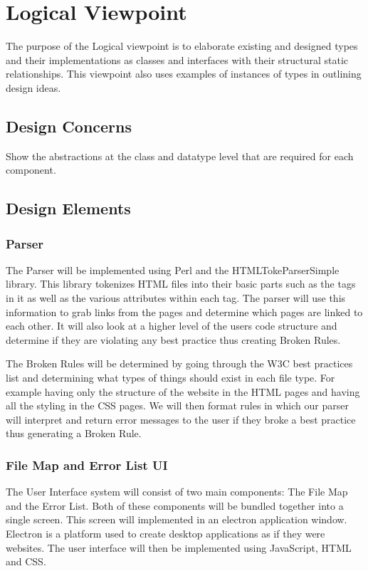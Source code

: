 \documentclass[letterpaper,10pt,titlepage,draftclsnofoot,onecolumn,onesided] {IEEEtran}
\begin{document}
	
	
\section{Logical Viewpoint}
The purpose of the Logical viewpoint is to elaborate existing and designed types and their implementations
as classes and interfaces with their structural static relationships. This viewpoint also uses examples of
instances of types in outlining design ideas. 
\subsection{Design Concerns}
Show the abstractions at the class and datatype level that are required for each component. 
\subsection{Design Elements}


	\subsubsection{Parser}
	The Parser will be implemented using Perl and the HTMLTokeParserSimple library\cite{htmltokeparser}.
	This library tokenizes HTML files into their basic parts such as the tags in it as well as the various attributes within each tag.
	The parser will use this information to grab links from the pages and determine which pages are linked to each other.
	It will also look at a higher level of the users code structure and determine if they are violating any best practice thus creating Broken Rules. 
	
	The Broken Rules will be determined by going through the W3C best practices list and determining what types of things should exist in each file type. 
	For example having only the structure of the website in the HTML pages and having all the styling in the CSS pages. 
	We will then format rules in which our parser will interpret and return error messages to the user if they broke a best practice thus generating a Broken Rule.\cite{w3c}
	

	\subsubsection{File Map and Error List UI}
	The User Interface system will consist of two main components: The File Map and the Error List. 
	Both of these components will be bundled together into a single screen. 
	This screen will implemented in an electron application window. 
	Electron is a platform used to create desktop applications as if they were websites. \cite{Electron}
	The user interface will then be implemented using JavaScript, HTML and CSS.
	
\end{document}
